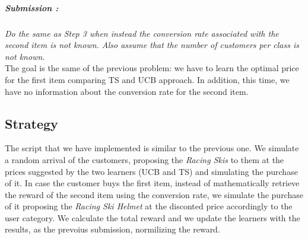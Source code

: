 \subparagraph*{Submission : }
\textit{Do the same as Step 3 when instead the conversion rate associated with the second item is not known. Also assume that the number of customers per class is not known.}\\

The goal is the same of the previous problem: we have to learn the optimal price for the first item comparing TS and UCB approach. In addition, this time, we have no information about the conversion rate for the second item. 

\subsection*{Strategy}
The script that we have implemented is similar to the previous one. We simulate a random arrival of the customers, proposing the \textit{Racing Skis} to them at the prices suggested by the two learners (UCB and TS) and simulating the purchase of it. In case the customer buys the first item, instead of mathematically retrieve the reward of the second item using the conversion rate, we simulate the purchase of it proposing the \textit{Racing Ski Helmet} at the disconted price accordingly to the user category. We calculate the total reward and we update the learners with the results, as the prevoius submission, normilizing the reward. 

